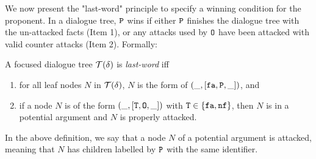 
    
    
    



We now present the "last-word" principle to specify a winning condition for the proponent. In a dialogue tree, $\texttt{\textup{P}}$ wins if either $\texttt{\textup{P}}$ finishes the dialogue tree with the un-attacked facts (Item 1), or any attacks used by $\texttt{\textup{O}}$ have been attacked with valid counter attacks (Item 2). Formally:

\begin{definition} A focused dialogue tree $\mathcal{T}(\delta)$ is \emph{last-word} iff

    \begin{enumerate}
     \item for all leaf nodes $N$ in $\mathcal{T}(\delta)$, $N$  is the form of $(\_, [\texttt{\textup{fa}}, \texttt{\textup{P}}, \_])$, and
     

     \item if a node $N$ is of the form $(\_, [\texttt{\textup{T}}, \texttt{\textup{O}}, \_])$ with $\texttt{\textup{T}} \in \{\texttt{\textup{fa}}, \texttt{\textup{nf}}\}$, then $N$ is in a potential argument and $N$ is properly attacked.   
    \end{enumerate}
\end{definition}
In the above definition, we say that a node $N$ of a potential argument is attacked, meaning that $N$ has children labelled by $\texttt{\textup{P}}$ with the same identifier.

